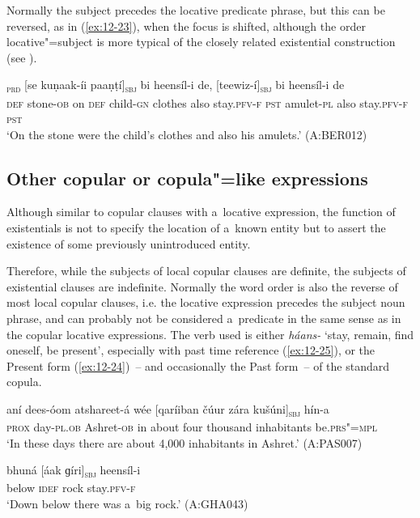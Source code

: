 Normally the subject precedes the locative predicate phrase, but this can be reversed, as in (\ref{ex:12-23}), when the focus is shifted, although the order locative"=subject is more typical of the closely related existential construction (see ).

\begin{exe}
\ex
\label{ex:12-23}
\textsubscript{\textsc{prd}} [se kuṇaak-íi paaṇṭí]\textsubscript{\textsc{sbj}} bi heensíl-i de, [teewiz-í]\textsubscript{\textsc{sbj}} bi heensíl-i de \\
\textsc{def} stone-\textsc{ob} on \textsc{def} child-\textsc{gn} clothes  also stay.\textsc{pfv-f}
\textsc{pst} amulet-\textsc{pl} also stay.\textsc{pfv-f} \textsc{pst} \\
\glt `On the stone were the child's clothes and also his amulets.' (A:BER012)
\end{exe}

\subsection{Other copular or copula"=like expressions}
\label{subsec:12-1-4}

 Although similar to copular clauses with a~locative expression, the function of existentials is not to specify the location of a~known entity but to assert the existence of some previously unintroduced entity. 


Therefore, while the subjects of local copular clauses are definite, the subjects of existential clauses are indefinite. Normally the word order is also the reverse of most local copular clauses, i.e. the locative expression precedes the subject noun phrase, and can probably not be considered a~predicate in the same sense as in the copular locative expressions. The verb used is either \textit{háans-} `stay, remain, find oneself, be present', especially with past time reference (\ref{ex:12-25}), or the Present form (\ref{ex:12-24})~-- and occasionally the Past form~-- of the standard copula.

\begin{exe}
\ex
\label{ex:12-24}
\gll aní dees-óom atshareet-á wée [qaríiban čúur zára kušúni]\textsubscript{\textsc{sbj}} hín-a \\
\textsc{prox} day-\textsc{pl.ob} Ashret-\textsc{ob} in about  four thousand inhabitants be.\textsc{prs"=mpl} \\
\glt `In these days there are about 4,000 inhabitants in Ashret.' (A:PAS007)

\ex
\label{ex:12-25}
\gll bhuná [áak ɡíri]\textsubscript{\textsc{sbj}} heensíl-i \\
below \textsc{idef} rock stay.\textsc{pfv-f} \\
\glt `Down below there was a~big rock.' (A:GHA043)
\end{exe}

